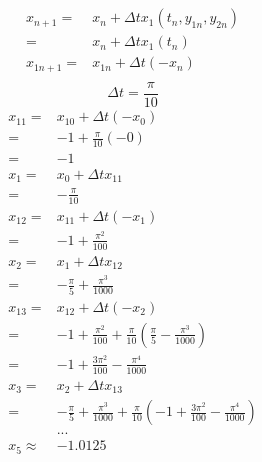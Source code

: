 \documentclass{article}
\begin{document}
        \subsection{}
            \begin{equation*}
                \begin{split}
                    x_{n+1}=&x_{n}+\Delta t x_1(t_n,y_{1n},y_{2n})\\
                        =&x_{n}+\Delta t x_1(t_n)\\
                    x_{1n+1}=&x_{1n}+\Delta t (-x_n)\\
                \end{split}
            \end{equation*}
            $$\Delta t=\frac{\pi}{10}$$
            \begin{equation*}
                \begin{split}
                    x_{11}=&x_{10}+\Delta t (-x_0)\\
                        =&-1+\frac{\pi}{10}(-0)\\
                        =&-1\\
                    x_1=&x_0+\Delta t x_{11}\\
                        =&-\frac{\pi}{10}\\
                    x_{12}=&x_{11}+\Delta t (-x_1)\\
                        =&-1+\frac{\pi^2}{100}\\
                    x_2=&x_1+\Delta t x_{12}\\
                        =&-\frac{\pi}{5}+\frac{\pi^3}{1000}\\
                    x_{13}=&x_{12}+\Delta t(-x_2)\\
                        =&-1+\frac{\pi^2}{100}+\frac{\pi}{10}(\frac{\pi}{5}-\frac{\pi^3}{1000})\\
                        =&-1+\frac{3\pi^2}{100}-\frac{\pi^4}{1000}\\
                    x_3=&x_2+\Delta t x_{13}\\
                        =&-\frac{\pi}{5}+\frac{\pi^3}{1000}+\frac{\pi}{10}(-1+\frac{3\pi^2}{100}-\frac{\pi^4}{1000})\\
                        &...\\
                    x_5\approx &-1.0125\\
                \end{split}
            \end{equation*}
            
            
\end{document}
